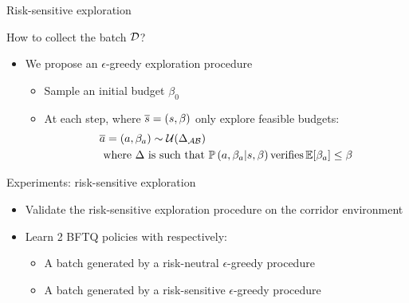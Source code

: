 \documentclass{beamer}
\begin{document}
    \begin{frame}{Risk-sensitive exploration}

        How to collect the batch $\mathcal{D}$?

        \begin{itemize}
            \item We propose an $\epsilon$-greedy exploration procedure
            \begin{itemize}
                \pause\item Sample an initial budget $\beta_0$
                \pause\item At each step, where $\overline{s}=(s,\beta)$ only explore feasible budgets:
                \pause\begin{align*}
                    &\overline{a} = (a, \beta_a)\sim\mathcal{U}(\Delta_{\mathcal{A}\mathcal{B}})\\
                    &\text{ where }  \Delta \text{ is such that }\mathbb{P}\left(a, \beta_a|s, \beta\right) \text{verifies} \operatorname*{\mathbb{E}}[\beta_a]\leq\beta
                \end{align*}
            \end{itemize}
        \end{itemize}


    \end{frame}

    \begin{frame}{Experiments: risk-sensitive exploration}

        \begin{itemize}
            \item Validate the risk-sensitive exploration procedure on the corridor environment
            \pause\item Learn 2 BFTQ policies with respectively:
            \begin{itemize}
                \item A batch generated by a risk-neutral $\epsilon$-greedy procedure
                \item A batch generated by a risk-sensitive $\epsilon$-greedy procedure
            \end{itemize}
        \end{itemize}
    \end{frame}
\end{document}

